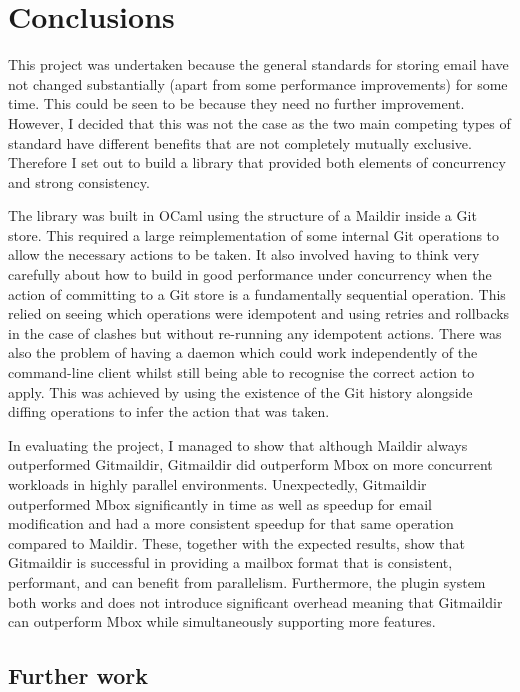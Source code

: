 \chapter{Conclusions}

This project was undertaken because the general standards for storing email have not changed substantially (apart from some performance improvements) for some time. This could be seen to be because they need no further improvement. However, I decided that this was not the case as the two main competing types of standard have different benefits that are not completely mutually exclusive. Therefore I set out to build a library that provided both elements of concurrency and strong consistency.

The library was built in OCaml using the structure of a Maildir inside a Git store. This required a large reimplementation of some internal Git operations to allow the necessary actions to be taken. It also involved having to think very carefully about how to build in good performance under concurrency when the action of committing to a Git store is a fundamentally sequential operation. This relied on seeing which operations were idempotent and using retries and rollbacks in the case of clashes but without re-running any idempotent actions. There was also the problem of having a daemon which could work independently of the command-line client whilst still being able to recognise the correct action to apply. This was achieved by using the existence of the Git history alongside diffing operations to infer the action that was taken.

In evaluating the project, I managed to show that although Maildir always outperformed Gitmaildir, Gitmaildir did outperform Mbox on more concurrent workloads in highly parallel environments. Unexpectedly, Gitmaildir outperformed Mbox significantly in time as well as speedup for email modification and had a more consistent speedup for that same operation compared to Maildir. These, together with the expected results, show that Gitmaildir is successful in providing a mailbox format that is consistent, performant, and can benefit from parallelism. Furthermore, the plugin system both works and does not introduce significant overhead meaning that Gitmaildir can outperform Mbox while simultaneously supporting more features.

\section{Further work}

